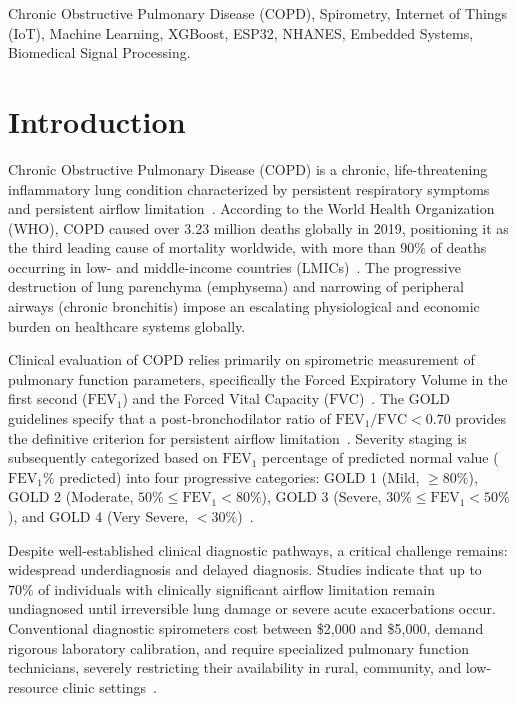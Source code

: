 \documentclass[conference]{IEEEtran}
\begin{document}
\begin{IEEEkeywords}
Chronic Obstructive Pulmonary Disease (COPD), Spirometry, Internet of Things (IoT), Machine Learning, XGBoost, ESP32, NHANES, Embedded Systems, Biomedical Signal Processing.
\end{IEEEkeywords}

\section{Introduction}
Chronic Obstructive Pulmonary Disease (COPD) is a chronic, life-threatening inflammatory lung condition characterized by persistent respiratory symptoms and persistent airflow limitation~\cite{who2024copd, gold2024}. According to the World Health Organization (WHO), COPD caused over 3.23 million deaths globally in 2019, positioning it as the third leading cause of mortality worldwide, with more than $90\%$ of deaths occurring in low- and middle-income countries (LMICs)~\cite{who2024copd}. The progressive destruction of lung parenchyma (emphysema) and narrowing of peripheral airways (chronic bronchitis) impose an escalating physiological and economic burden on healthcare systems globally.

Clinical evaluation of COPD relies primarily on spirometric measurement of pulmonary function parameters, specifically the Forced Expiratory Volume in the first second ($\text{FEV}_1$) and the Forced Vital Capacity ($\text{FVC}$)~\cite{graham2019spirometry}. The GOLD guidelines specify that a post-bronchodilator ratio of $\text{FEV}_1/\text{FVC} < 0.70$ provides the definitive criterion for persistent airflow limitation~\cite{gold2024}. Severity staging is subsequently categorized based on $\text{FEV}_1$ percentage of predicted normal value ($\text{FEV}_1\%$ predicted) into four progressive categories: GOLD 1 (Mild, $\ge 80\%$), GOLD 2 (Moderate, $50\% \le \text{FEV}_1 < 80\%$), GOLD 3 (Severe, $30\% \le \text{FEV}_1 < 50\%$), and GOLD 4 (Very Severe, $< 30\%$)~\cite{gold2024, hankinson1999spirometric}.

Despite well-established clinical diagnostic pathways, a critical challenge remains: widespread underdiagnosis and delayed diagnosis. Studies indicate that up to $70\%$ of individuals with clinically significant airflow limitation remain undiagnosed until irreversible lung damage or severe acute exacerbations occur. Conventional diagnostic spirometers cost between \$2,000 and \$5,000, demand rigorous laboratory calibration, and require specialized pulmonary function technicians, severely restricting their availability in rural, community, and low-resource clinic settings~\cite{badr2020smart}.
\end{document}
